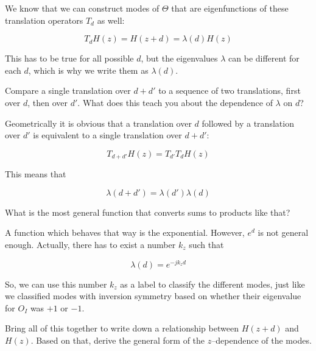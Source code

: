 We know that we can construct modes of $\Theta$ that are eigenfunctions of these translation operators $T_d$ as well:

\begin{equation}
T_d H(z) = H(z + d) = \lambda(d) H(z)
\end{equation} 

This has to be true for all possible $d$, but the eigenvalues $\lambda$ can be different for each $d$, which is why we write them as $\lambda(d)$. 

\begin{cue}
Compare a single translation over $d+d'$ to a sequence of two translations, first over $d$, then over $d'$. What does this teach you about the dependence of $\lambda$ on $d$?
\end{cue}

Geometrically it is obvious that a translation over $d$ followed by a translation over $d'$ is equivalent to a single translation over $d+d'$:

\begin{equation}
T_{d+d'}H(z) = T_{d'}T_{d}H(z)
\end{equation} 

This means that

\begin{equation}
\lambda(d + d')=\lambda(d')\lambda(d)
\end{equation} 

\begin{cue}
What is the most general function that converts sums to products like that?
\end{cue}

\noindent{}A function which behaves that way is the exponential. However, $e^d$ is not general enough. Actually, there has to exist a number $k_z$ such that

\begin{equation}
\lambda(d) = e^{-j k_z d}
\end{equation} 

So, we can use this number $k_z$ as a label to classify the different modes, just like we classified modes with inversion symmetry based on whether their eigenvalue for $O_I$ was $+1$ or $-1$.

\begin{cue}
Bring all of this together to write down a relationship between $H(z + d)$ and $H(z)$. Based on that, derive the general form of the  $z$--dependence of the modes. 
\end{cue}

